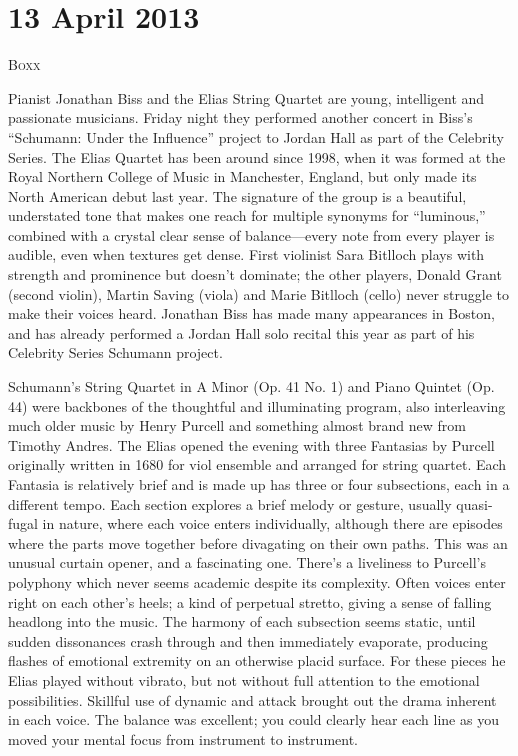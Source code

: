\chapter{13 April 2013}

\textsc{Boxx}

Pianist Jonathan Biss and the Elias String Quartet are young, intelligent and passionate musicians. Friday night they performed another concert in Biss’s “Schumann: Under the Influence” project to Jordan Hall as part of the Celebrity Series. The Elias Quartet has been around since 1998, when it was formed at the Royal Northern College of Music in Manchester, England, but only made its North American debut last year. The signature of the group is a beautiful, understated tone that makes one reach for multiple synonyms for “luminous,” combined with a crystal clear sense of balance—every note from every player is audible, even when textures get dense. First violinist Sara Bitlloch plays with strength and prominence but doesn’t dominate; the other players, Donald Grant (second violin), Martin Saving (viola) and Marie Bitlloch (cello) never struggle to make their voices heard. Jonathan Biss has made many appearances in Boston, and has already performed a Jordan Hall solo recital this year as part of his Celebrity Series Schumann project.

Schumann’s String Quartet in A Minor (Op. 41 No. 1) and Piano Quintet (Op. 44) were backbones of the thoughtful and illuminating program, also interleaving much older music by Henry Purcell and something almost brand new from Timothy Andres. The Elias opened the evening with three Fantasias by Purcell originally written in 1680 for viol ensemble and arranged for string quartet. Each Fantasia is relatively brief and is made up has three or four subsections, each in a different tempo. Each section explores a brief melody or gesture, usually quasi-fugal in nature, where each voice enters individually, although there are episodes where the parts move together before divagating on their own paths. This was an unusual curtain opener, and a fascinating one. There’s a liveliness to Purcell’s polyphony which never seems academic despite its complexity. Often voices enter right on each other’s heels; a kind of perpetual stretto, giving a sense of falling headlong into the music. The harmony of each subsection seems static, until sudden dissonances crash through and then immediately evaporate, producing flashes of emotional extremity on an otherwise placid surface. For these pieces he Elias played without vibrato, but not without full attention to the emotional possibilities. Skillful use of dynamic and attack brought out the drama inherent in each voice. The balance was excellent; you could clearly hear each line as you moved your mental focus from instrument to instrument.

